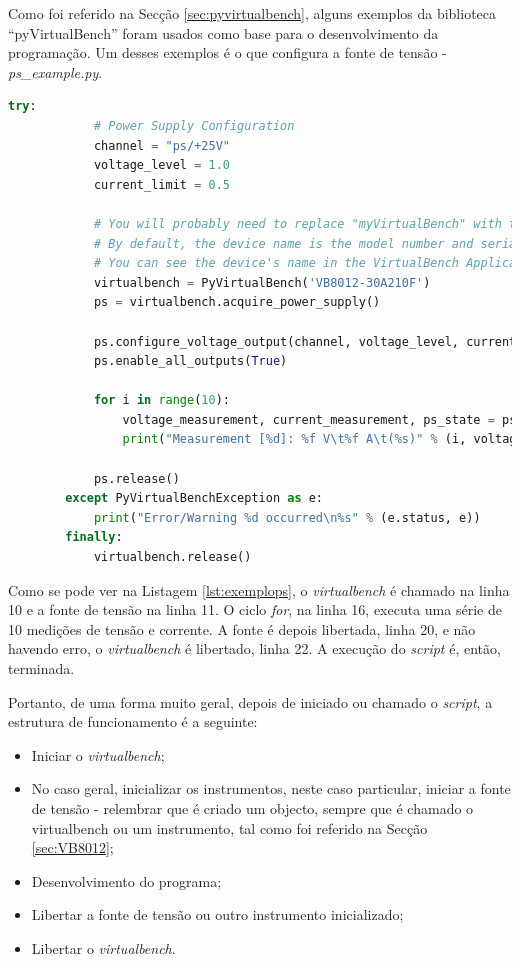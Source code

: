 Como foi referido na Secção \ref{sec:pyvirtualbench}, alguns exemplos da biblioteca ``pyVirtualBench'' foram usados como base para o desenvolvimento da programação. Um desses exemplos é o que configura a fonte de tensão - \textit{ps\_example.py}.


\begin{minipage}{0.9\linewidth}
	\begin{lstlisting}[language=Python, caption=Exemplo \textit{ps\_example.py}, label=lst:exemplops]
		try:
			# Power Supply Configuration
			channel = "ps/+25V"
			voltage_level = 1.0
			current_limit = 0.5

			# You will probably need to replace "myVirtualBench" with the name of your device.
			# By default, the device name is the model number and serial number separated by a hyphen; e.g., "VB8012-309738A".
			# You can see the device's name in the VirtualBench Application under File->About
			virtualbench = PyVirtualBench('VB8012-30A210F')
			ps = virtualbench.acquire_power_supply()

			ps.configure_voltage_output(channel, voltage_level, current_limit)
			ps.enable_all_outputs(True)

			for i in range(10):
				voltage_measurement, current_measurement, ps_state = ps.read_output(channel)
				print("Measurement [%d]: %f V\t%f A\t(%s)" % (i, voltage_measurement, current_measurement, str(ps_state)))

			ps.release()
		except PyVirtualBenchException as e:
    		print("Error/Warning %d occurred\n%s" % (e.status, e))
		finally:
    		virtualbench.release()

	\end{lstlisting}
\end{minipage}

Como se pode ver na Listagem \ref{lst:exemplops}, o \textit{virtualbench} é chamado na linha 10 e a fonte de tensão na linha 11. O ciclo \textit{for}, na linha 16, executa uma série de 10 medições de tensão e corrente. A fonte é depois libertada, linha 20, e não havendo erro, o \textit{virtualbench} é libertado, linha 22. A execução do \textit{script} é, então, terminada.

Portanto, de uma forma muito geral, depois de iniciado ou chamado o \textit{script}, a estrutura de funcionamento é a seguinte:
\begin{itemize}
	\item Iniciar o \textit{virtualbench};
	\item No caso geral, inicializar os instrumentos, neste caso particular, iniciar a fonte de tensão - relembrar que é criado um objecto, sempre que é chamado o \acrshort{virtualbench} ou um instrumento, tal como foi referido na Secção \ref{sec:VB8012};
	\item Desenvolvimento do programa;
	\item Libertar a fonte de tensão ou outro instrumento inicializado;
	\item Libertar o \textit{virtualbench}.
\end{itemize}

